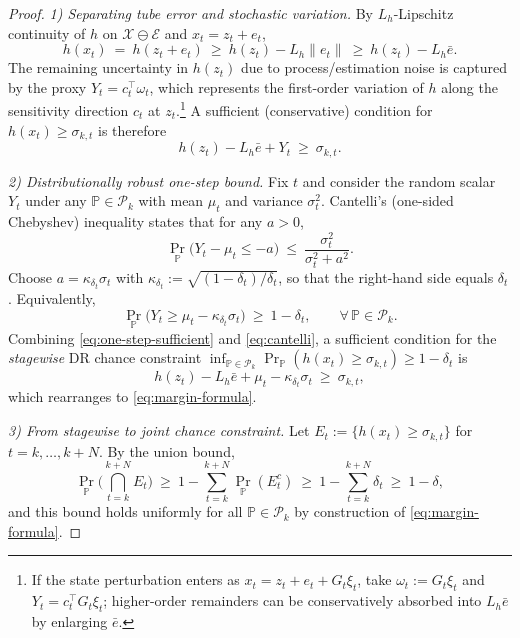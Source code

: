 \documentclass[journal]{IEEEtran}
\theoremstyle{definition}
\begin{document}
\begin{proof}
\textit{1) Separating tube error and stochastic variation.}
By $L_h$-Lipschitz continuity of $h$ on $\mathcal{X}\ominus\mathcal{E}$ and $x_t=z_t+e_t$,
\begin{equation}
h(x_t)\ =\ h(z_t+e_t)\ \ge\ h(z_t) - L_h\|e_t\|\ \ge\ h(z_t) - L_h\bar e.
\label{eq:lipschitz-offset}
\end{equation}
The remaining uncertainty in $h(z_t)$ due to process/estimation noise is captured by the proxy $Y_t=c_t^\top\omega_t$,
which represents the first-order variation of $h$ along the sensitivity direction $c_t$ at $z_t$.\footnote{If the
state perturbation enters as $x_t=z_t+e_t+G_t\xi_t$, take $\omega_t:=G_t\xi_t$ and $Y_t=c_t^\top G_t\xi_t$; higher-order
remainders can be conservatively absorbed into $L_h\bar e$ by enlarging $\bar e$.}
A sufficient (conservative) condition for $h(x_t)\!\ge\!\sigma_{k,t}$ is therefore
\begin{equation}
h(z_t) - L_h\bar e + Y_t \ \ge\ \sigma_{k,t}.
\label{eq:one-step-sufficient}
\end{equation}

\textit{2) Distributionally robust one-step bound.}
Fix $t$ and consider the random scalar $Y_t$ under any $\mathbb{P}\in\mathcal{P}_k$ with mean $\mu_t$ and variance $\sigma_t^2$.
Cantelli's (one-sided Chebyshev) inequality states that for any $a>0$,
\[
\Pr_{\mathbb{P}}\!\big(Y_t - \mu_t \le -a\big)\ \le\ \frac{\sigma_t^2}{\sigma_t^2+a^2}.
\]
Choose $a=\kappa_{\delta_t}\sigma_t$ with $\kappa_{\delta_t}:=\sqrt{(1-\delta_t)/\delta_t}$, so that the right-hand side equals $\delta_t$.
Equivalently,
\begin{equation}
\Pr_{\mathbb{P}}\!\big(Y_t \ge \mu_t - \kappa_{\delta_t}\sigma_t\big)\ \ge\ 1-\delta_t,
\qquad \forall\,\mathbb{P}\in\mathcal{P}_k.
\label{eq:cantelli}
\end{equation}
Combining \eqref{eq:one-step-sufficient} and \eqref{eq:cantelli}, a sufficient condition for the \emph{stagewise} DR chance constraint
$\inf_{\mathbb{P}\in\mathcal{P}_k}\Pr_{\mathbb{P}}(h(x_t)\ge \sigma_{k,t})\ge 1-\delta_t$ is
\[
h(z_t) - L_h\bar e + \mu_t - \kappa_{\delta_t}\sigma_t \ \ge\ \sigma_{k,t},
\]
which rearranges to \eqref{eq:margin-formula}.

\textit{3) From stagewise to joint chance constraint.}
Let $E_t:=\{h(x_t)\ge \sigma_{k,t}\}$ for $t=k,\dots,k{+}N$. By the union bound,
\[
\Pr_{\mathbb{P}}\!\Big(\bigcap_{t=k}^{k+N} E_t\Big)\ \ge\ 1 - \sum_{t=k}^{k+N}\Pr_{\mathbb{P}}(E_t^c)
\ \ge\ 1 - \sum_{t=k}^{k+N}\delta_t\ \ge\ 1-\delta,
\]
and this bound holds uniformly for all $\mathbb{P}\in\mathcal{P}_k$ by construction of \eqref{eq:margin-formula}.


\end{proof}
\end{document}
